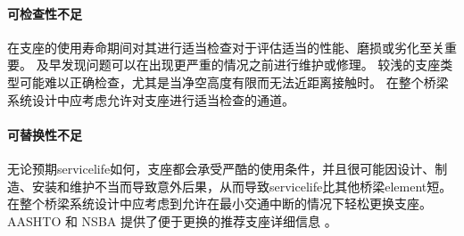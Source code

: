 \paragraph{可检查性不足}
在支座的{使用寿命}期间对其进行适当检查对于评估适当的性能、磨损或劣化至关重要。 及早发现问题可以在出现更严重的情况之前进行维护或修理。 较浅的支座类型可能难以正确检查，尤其是当净空高度有限而无法近距离接触时。 在整个桥梁系统设计中应考虑允许对支座进行适当检查的通道。

\paragraph{可替换性不足}

无论预期\gls*{servicelife}如何，支座都会承受严酷的使用条件，并且很可能因设计、制造、安装和维护不当而导致意外后果，从而导致\gls*{servicelife}比其他桥梁\gls*{element}短。 在整个桥梁系统设计中应考虑到允许在最小交通中断的情况下轻松更换支座。 AASHTO 和 NSBA 提供了便于更换的推荐支座详细信息 \cite{aashtonsba2004s}。

